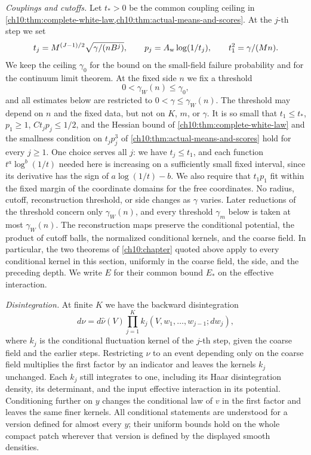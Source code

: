 \emph{Couplings and cutoffs.} Let $t_*>0$ be the common coupling ceiling in \cref{ch10:thm:complete-white-law,ch10:thm:actual-means-and-scores}. At the $j$-th step we set
\begin{equation}\label{ch31:eq:common-kernel-gate}
 t_j=M^{(J-1)/2}\sqrt{\gamma/(nB^j)},\qquad p_j=A_{\rm w}\log(1/t_j),\qquad t_1^2=\gamma/(Mn).
\end{equation}
We keep the ceiling $\gamma_0$ for the bound on the small-field failure probability and for the continuum limit theorem. At the fixed side $n$ we fix a threshold
\begin{equation}\label{ch31:eq:weak-coupling-threshold}
 0<\gamma_W(n)\le\gamma_0,
\end{equation}
and all estimates below are restricted to $0<\gamma\le\gamma_W(n)$. The threshold may depend on $n$ and the fixed data, but not on $K$, $m$, or $\gamma$. It is so small that $t_1\le t_*$, $p_1\ge1$, $Ct_jp_j\le1/2$, and the Hessian bound of \cref{ch10:thm:complete-white-law} and the smallness condition on $t_jp_j^3$ of \cref{ch10:thm:actual-means-and-scores} hold for every $j\ge1$. One choice serves all $j$: we have $t_j\le t_1$, and each function $t^a\log^b(1/t)$ needed here is increasing on a sufficiently small fixed interval, since its derivative has the sign of $a\log(1/t)-b$. We also require that $t_1p_1$ fit within the fixed margin of the coordinate domains for the free coordinates. No radius, cutoff, reconstruction threshold, or side changes as $\gamma$ varies. Later reductions of the threshold concern only $\gamma_W(n)$, and every threshold $\gamma_m$ below is taken at most $\gamma_W(n)$. The reconstruction maps preserve the conditional potential, the product of cutoff balls, the normalized conditional kernels, and the coarse field. In particular, the two theorems of \cref{ch10:chapter} quoted above apply to every conditional kernel in this section, uniformly in the coarse field, the side, and the preceding depth. We write $E$ for their common bound $E_*$ on the effective interaction.

\emph{Disintegration.} At finite $K$ we have the backward disintegration
\begin{equation}\label{ch31:eq:product-disintegration}
 d\nu=d\widehat\nu(V)\prod_{j=1}^Kk_j(V,w_1,\dots,w_{j-1};dw_j),
\end{equation}
where $k_j$ is the conditional fluctuation kernel of the $j$-th step, given the coarse field and the earlier steps. Restricting $\nu$ to an event depending only on the coarse field multiplies the first factor by an indicator and leaves the kernels $k_j$ unchanged. Each $k_j$ still integrates to one, including its Haar disintegration density, its determinant, and the input effective interaction in its potential. Conditioning further on $y$ changes the conditional law of $v$ in the first factor and leaves the same finer kernels. All conditional statements are understood for a version defined for almost every $y$; their uniform bounds hold on the whole compact patch wherever that version is defined by the displayed smooth densities.

